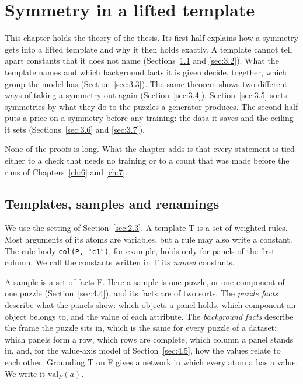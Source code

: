 \chapter{Symmetry in a lifted template}\label{ch:3}

This chapter holds the theory of the thesis. Its first half explains how a symmetry gets into a lifted template and why it then holds exactly. A template cannot tell apart constants that it does not name (Sections~\ref{sec:3.1} and \ref{sec:3.2}). What the template names and which background facts it is given decide, together, which group the model has (Section~\ref{sec:3.3}). The same theorem shows two different ways of taking a symmetry out again (Section~\ref{sec:3.4}). Section~\ref{sec:3.5} sorts symmetries by what they do to the puzzles a generator produces. The second half puts a price on a symmetry before any training: the data it saves and the ceiling it sets (Sections~\ref{sec:3.6} and \ref{sec:3.7}).

None of the proofs is long. What the chapter adds is that every statement is tied either to a check that needs no training or to a count that was made before the runs of Chapters~\ref{ch:6} and \ref{ch:7}.

\section{Templates, samples and renamings}\label{sec:3.1}

We use the setting of Section~\ref{sec:2.3}. A template T is a set of weighted rules. Most arguments of its atoms are variables, but a rule may also write a constant. The rule body \texttt{col(P, "c1")}, for example, holds only for panels of the first column. We call the constants written in T its \emph{named} constants.

A sample is a set of facts F. Here a sample is one puzzle, or one component of one puzzle (Section~\ref{sec:4.4}), and its facts are of two sorts. The \emph{puzzle facts} describe what the panels show: which objects a panel holds, which component an object belongs to, and the value of each attribute. The \emph{background facts} describe the frame the puzzle sits in, which is the same for every puzzle of a dataset: which panels form a row, which rows are complete, which column a panel stands in, and, for the value-axis model of Section~\ref{sec:4.5}, how the values relate to each other. Grounding T on F gives a network in which every atom a has a value. We write it \(\mathrm{val}_F(a)\).

